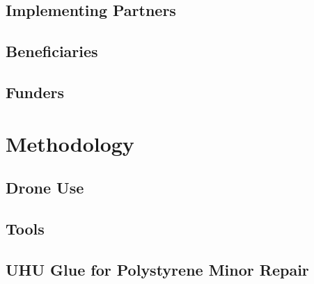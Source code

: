 \documentclass[a4paper,12pt,twoside]{article}
\begin{document}
\subsection{Implementing Partners}

\begin{multicols}{2}
\lipsum[0-5]
\end{multicols}

\subsection{Beneficiaries}

\begin{multicols}{2}
\lipsum[0-5]
\end{multicols}

\subsection{Funders}

\begin{multicols}{2}
\lipsum[0-5]
\end{multicols}

\section{Methodology}

\begin{multicols}{2}
\lipsum[0-5]
\end{multicols}

\subsection{Drone Use}

\begin{multicols}{2}
\lipsum[0-5]
\end{multicols}

\subsection{Tools}

\begin{multicols}{2}
\lipsum[0-5]
\end{multicols}

\subsection{UHU Glue for Polystyrene Minor Repair}
\end{document}
